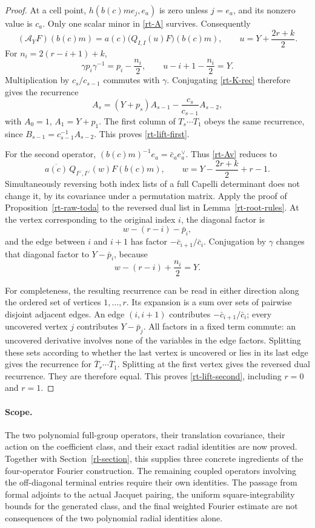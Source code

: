 \begin{proof}
At a cell point, $h(b(c)me_j,e_a)$ is zero unless
$j=e_a$, and its nonzero value is $c_a$.
Only one scalar minor in \eqref{rt-A} survives.
Consequently
\[
 (\mathcal A_YF)(b(c)m)
      =a(c)\bigl(Q_{I,I}(u)F\bigr)(b(c)m),
             \qquad u=Y+\frac{2r+k}{2}.
\]
For $n_i=2(r-i+1)+k$,
\[
 \gamma p_i\gamma^{-1}=p_i-\frac{n_i}{2},
 \qquad u-i+1-\frac{n_i}{2}=Y.
\]
Multiplication by $c_s/c_{s-1}$ commutes with
$\gamma$.  Conjugating \eqref{rt-K-rec} therefore
gives the recurrence
\[
 A_s=(Y+p_s)A_{s-1}
                -\frac{c_s}{c_{s-1}}A_{s-2},
\]
with $A_0=1$, $A_1=Y+p_1$.
The first column of $T_s\cdots T_1$ obeys the
same recurrence, since $B_{s-1}=c_{s-1}^{-1}A_{s-2}$.
This proves \eqref{rt-lift-first}.

For the second operator,
$(b(c)m)^{-1}e_a=\bar c_a e_a^\vee$.
Thus \eqref{rt-Av} reduces to
\[
 \overline{a(c)}\,
 Q_{I^\vee,I^\vee}(w)F(b(c)m),
        \qquad w=Y-\frac{2r+k}{2}+r-1 .
\]
Simultaneously reversing both index lists of a
full Capelli determinant does not change it,
by its covariance under a permutation matrix.
Apply the proof of Proposition~\ref{rt-raw-toda}
to the reversed dual list in
Lemma~\ref{rt-root-rules}.
At the vertex corresponding to the original
index $i$, the diagonal factor is
\[
                w-(r-i)-\bar p_i,
\]
and the edge between $i$ and $i+1$ has factor
$-\bar c_{i+1}/\bar c_i$.
Conjugation by $\gamma$ changes that diagonal
factor to $Y-\bar p_i$, because
\[
 w-(r-i)+\frac{n_i}{2}=Y.
\]

For completeness, the resulting recurrence can
be read in either direction along the ordered
set of vertices $1,\ldots,r$.
Its expansion is a sum over sets of pairwise
disjoint adjacent edges.  An edge $(i,i+1)$
contributes $-\bar c_{i+1}/\bar c_i$; every
uncovered vertex $j$ contributes $Y-\bar p_j$.
All factors in a fixed term commute: an
uncovered derivative involves none of the
variables in the edge factors.  Splitting these
sets according to whether the last vertex is
uncovered or lies in its last edge gives the
recurrence for $\overline T_r\cdots\overline T_1$.
Splitting at the first vertex gives the reversed
dual recurrence.  They are therefore equal.
This proves \eqref{rt-lift-second}, including
$r=0$ and $r=1$.
\end{proof}

\paragraph{Scope.}
The two polynomial full-group operators, their
translation covariance, their action on the
coefficient class, and their exact radial
identities are now proved.  Together with
Section~\ref{rl-section}, this supplies three
concrete ingredients of the four-operator
Fourier construction.  The remaining coupled
operators involving the off-diagonal terminal
entries require their own identities.  The
passage from formal adjoints to the actual
Jacquet pairing, the uniform square-integrability
bounds for the generated class, and the final
weighted Fourier estimate are not consequences
of the two polynomial radial identities alone.


